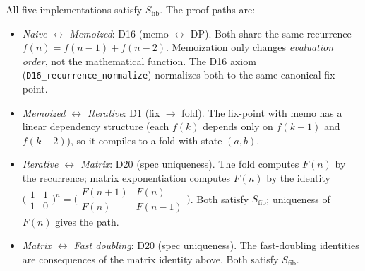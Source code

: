 \begin{theorem}
\label{thm:fib-equiv}
All five implementations satisfy $S_{\mathrm{fib}}$.  The proof paths are:
\begin{itemize}
  \item \emph{Naive $\leftrightarrow$ Memoized}: D16 (memo $\leftrightarrow$ DP).
    Both share the same recurrence
    $f(n) = f(n{-}1) + f(n{-}2)$.  Memoization only changes
    \emph{evaluation order}, not the mathematical function.  The
    D16 axiom (\texttt{D16\_recurrence\_normalize}) normalizes
    both to the same canonical fix-point.
  \item \emph{Memoized $\leftrightarrow$ Iterative}: D1
    (fix $\to$ fold).  The fix-point with memo has a linear
    dependency structure (each $f(k)$ depends only on $f(k{-}1)$
    and $f(k{-}2)$), so it compiles to a fold with state
    $(a, b)$.
  \item \emph{Iterative $\leftrightarrow$ Matrix}: D20
    (spec uniqueness).  The fold computes $F(n)$ by the
    recurrence; matrix exponentiation computes $F(n)$ by the
    identity $\bigl(\begin{smallmatrix}1&1\\1&0\end{smallmatrix}\bigr)^n
    = \bigl(\begin{smallmatrix}F(n{+}1)&F(n)\\
    F(n)&F(n{-}1)\end{smallmatrix}\bigr)$.
    Both satisfy $S_{\mathrm{fib}}$; uniqueness of $F(n)$ gives
    the path.
  \item \emph{Matrix $\leftrightarrow$ Fast doubling}: D20
    (spec uniqueness).  The fast-doubling identities are
    consequences of the matrix identity above.  Both satisfy
    $S_{\mathrm{fib}}$.
\end{itemize}
\end{theorem}

